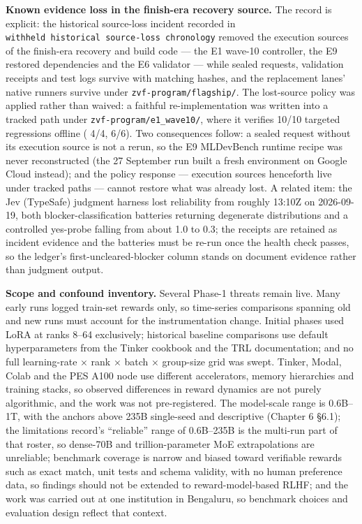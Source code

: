 \documentclass[12pt,a4paper]{report}
\DeclareRobustCommand{\longtok}[1]{\texttt{\seqsplit{#1}}}
\begin{document}
\textbf{Known evidence loss in the finish-era recovery source.} The
record is explicit: the historical source-loss incident recorded in
\texttt{withheld\ historical\ source-loss\ chronology} removed the
execution sources of the finish-era recovery and build code --- the E1
wave-10 controller, the E9 restored dependencies and the E6 validator
--- while sealed requests, validation receipts and test logs survive
with matching hashes, and the replacement lanes' native runners survive
under \texttt{zvf-program/flagship/}. The lost-source policy was applied
rather than waived: a faithful re-implementation was written into a
tracked path under \texttt{zvf-program/e1\_wave10/}, where it verifies
10/10 targeted regressions offline (\longtok{test\_\allowbreak{}process\_\allowbreak{}group.py}
4/4, \longtok{test\_\allowbreak{}cleanup\_\allowbreak{}regressions.py} 6/6). Two consequences
follow: a sealed request without its execution source is not a rerun, so
the E9 MLDevBench runtime recipe was never reconstructed (the 27
September run built a fresh environment on Google Cloud instead); and
the policy response --- execution sources henceforth live under tracked
paths --- cannot restore what was already lost. A related item: the Jev
(TypeSafe) judgment harness lost reliability from roughly 13:10Z on
2026-09-19, both blocker-classification batteries returning degenerate
distributions and a controlled yes-probe falling from about 1.0 to 0.3;
the receipts are retained as incident evidence and the batteries must be
re-run once the health check passes, so the ledger's
first-uncleared-blocker column stands on document evidence rather than
judgment output.

\textbf{Scope and confound inventory.} Several Phase-1 threats remain
live. Many early runs logged train-set rewards only, so time-series
comparisons spanning old and new runs must account for the
instrumentation change. Initial phases used LoRA at ranks 8--64
exclusively; historical baseline comparisons use default hyperparameters
from the Tinker cookbook and the TRL documentation; and no full
learning-rate × rank × batch × group-size grid was swept. Tinker, Modal,
Colab and the PES A100 node use different accelerators, memory
hierarchies and training stacks, so observed differences in reward
dynamics are not purely algorithmic, and the work was not
pre-registered. The model-scale range is 0.6B--1T, with the anchors
above 235B single-seed and descriptive (Chapter 6 §6.1); the limitations
record's ``reliable'' range of 0.6B--235B is the multi-run part of that
roster, so dense-70B and trillion-parameter MoE extrapolations are
unreliable; benchmark coverage is narrow and biased toward verifiable
rewards such as exact match, unit tests and schema validity, with no
human preference data, so findings should not be extended to
reward-model-based RLHF; and the work was carried out at one institution
in Bengaluru, so benchmark choices and evaluation design reflect that
context.
\end{document}

